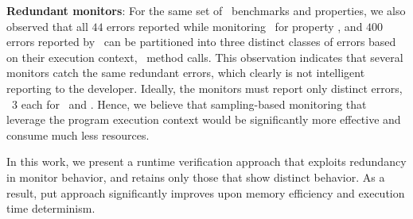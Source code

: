 \begin{challenges}
 \item \textbf{Redundant monitors}: For the same set of \dacapo\ 
benchmarks and properties, we also observed that all $44$ errors reported while 
monitoring \bloat\ for property \hasnext, and $400$ errors 
reported by \pmd\ can be partitioned into three distinct classes of errors 
based on their execution context, \ie\ method calls.
% 
% 
This observation indicates that several monitors catch the same redundant 
errors, which clearly is not intelligent reporting to the developer. Ideally, 
the monitors must report only distinct errors, \ie\ $3$ each
for \bloat~and \pmd. 
Hence, we believe that sampling-based monitoring that leverage the program execution 
context would be significantly more effective and consume much less resources.
\end{challenges}


In this work, we present a runtime verification approach that exploits 
redundancy in monitor behavior, and retains only those that show distinct 
behavior. As a result, put approach significantly improves upon memory 
efficiency and execution time determinism. 

